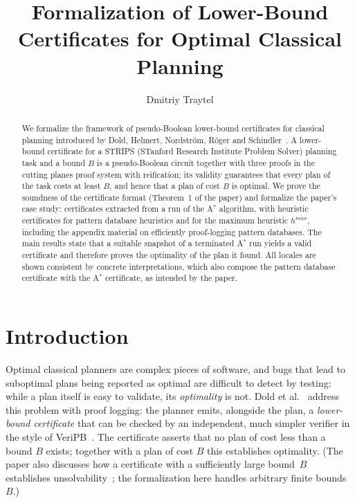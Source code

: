 \documentclass[11pt,a4paper]{article}
\begin{document}
\title{Formalization of Lower-Bound Certificates for Optimal Classical Planning}
\author{Dmitriy Traytel}
\maketitle

\begin{abstract}
We formalize the framework of pseudo-Boolean lower-bound certificates for
classical planning introduced by Dold, Helmert, Nordstr\"om, R\"oger and
Schindler~\cite{DoldHNRS25}. A lower-bound certificate for a STRIPS (STanford
Research Institute Problem Solver) planning task
and a bound $B$ is a pseudo-Boolean circuit together with three proofs in
the cutting planes proof system with reification; its validity guarantees that
every plan of the task costs at least $B$, and hence that a plan of cost $B$ is
optimal. We prove the soundness of the certificate format (Theorem~1 of the
paper) and formalize the paper's case study: certificates extracted from a run
of the A$^*$ algorithm, with heuristic certificates for pattern database
heuristics and for the maximum heuristic $h^{\mathit{max}}$, including the
appendix material on efficiently proof-logging pattern databases. The main
results state that a suitable snapshot of a terminated A$^*$ run yields a
valid certificate and therefore proves the optimality of the plan it found.
All locales are shown consistent by concrete interpretations, which also
compose the pattern database certificate with the A$^*$ certificate, as
intended by the paper.
\end{abstract}

\tableofcontents

\section{Introduction}

Optimal classical planners are complex pieces of software, and bugs that lead
to suboptimal plans being reported as optimal are difficult to detect by
testing: while a plan itself is easy to validate, its \emph{optimality} is
not. Dold et al.~\cite{DoldHNRS25} address this problem with proof logging:
the planner emits, alongside the plan, a \emph{lower-bound certificate} that
can be checked by an independent, much simpler verifier in the style of
VeriPB~\cite{BogaertsGMN23}. The certificate asserts that no plan of cost
less than a bound $B$ exists; together with a plan of cost $B$ this
establishes optimality.  (The paper also discusses how a certificate
with a sufficiently large bound~$B$ establishes
unsolvability~\cite{ErikssonRH17}; the formalization here handles
arbitrary finite bounds~$B$.)
\end{document}
